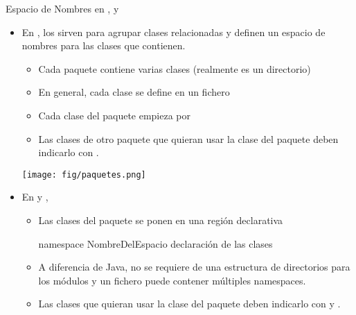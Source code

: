 \documentclass[10pt,envcountsect,spanish]{beamer}
\begin{document}




\begin{frame}[fragile]{Espacio de Nombres en ,  y } 

\begin{itemize}
\item En , los  sirven para agrupar clases relacionadas y definen un espacio de nombres  para las clases que contienen.
	\begin{itemize}
	\item Cada paquete contiene varias clases (realmente es un directorio)
	\item En general, cada clase se define en un fichero 
	\item Cada clase del paquete  empieza por 
	\item Las clases de otro paquete que quieran usar la clase  del paquete  deben indicarlo con .
	\end{itemize}

\centerline{\texttt{[image: fig/paquetes.png]}}


\item En  y , 
	\begin{itemize}
	\item Las clases del paquete  se ponen en una región declarativa
\begin{code}
  namespace NombreDelEspacio {
      declaración de las clases
  }
\end{code}
\item A diferencia de Java, no se requiere de una estructura de directorios para los módulos y un fichero puede contener múltiples namespaces.
	\item Las clases que quieran usar la clase  del paquete  deben indicarlo con 
		 y .
	
	\end{itemize}
\end{itemize}
\end{frame}
\end{document}
